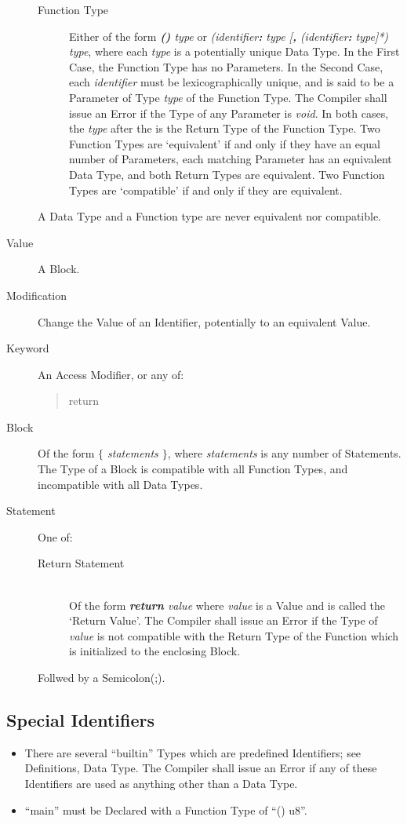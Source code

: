 \documentclass{article}
\begin{document}
\begin{description}
\begin{description}
		\item[Function Type] Either of the form \textit{\textbf{() \ret} type} or \textit{(identifier\textbf{:} type [\textbf{,} (identifier\textbf{:} type]*) \ret type}, where each \textit{type} is a potentially unique Data Type. In the First Case, the Function Type has no Parameters. In the Second Case, each \textit{identifier} must be lexicographically unique, and is said to be a Parameter of Type \textit{type} of the Function Type. The Compiler shall issue an Error if the Type of any Parameter is \textit{void}. In both cases, the \textit{type} after the \textit{\ret} is the Return Type of the Function Type. Two Function Types are `equivalent' if and only if they have an equal number of Parameters, each matching Parameter has an equivalent Data Type, and both Return Types are equivalent. Two Function Types are `compatible' if and only if they are equivalent.
		\end{description}
		A Data Type and a Function type are never equivalent nor compatible.
	\item[Value] A Block.
	\item[Modification] Change the Value of an Identifier, potentially to an equivalent Value.
	\item[Keyword] An Access Modifier, or any of:
		\begin{quote}
		return
		\end{quote}
	\item[Block] Of the form \textit{\textbf{$\{$} statements \textbf{$\}$}}, where \textit{statements} is any number of Statements. The Type of a Block is compatible with all Function Types, and incompatible with all Data Types.
	\item[Statement] One of:
		\begin{description}
		\item[Return Statement] \hfill \\ Of the form \textit{\textbf{return} value} where \textit{value} is a Value and is called the `Return Value'. The Compiler shall issue an Error if the Type of \textit{value} is not compatible with the Return Type of the Function which is initialized to the enclosing Block.
		\end{description}
		Follwed by a Semicolon(;). 
	\end{description}
\subsection{Special Identifiers}
	\begin{itemize}
	\item[] There are several ``builtin'' Types which are predefined Identifiers; see Definitions, Data Type. The Compiler shall issue an Error if any of these Identifiers are used as anything other than a Data Type.
	\item[] ``main'' must be Declared with a Function Type of ``() \ret u8''. 
	\end{itemize}
\end{document}
